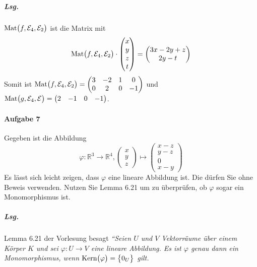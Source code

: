\documentclass{scrreprt}
\newcommand\Kern{\text{Kern}}
\newcommand\Mat{\text{Mat}}
\begin{document}
\begin{enumerate}[(a)]
  \subparagraph{Lsg.} $\Mat\qty\big(f, \mathcal{E}_4, \mathcal{E}_2)$ ist die
  Matrix mit
  \[
    \Mat\qty\big(f, \mathcal{E}_4, \mathcal{E}_2) \cdot
    \begin{pmatrix} x \\ y \\ z \\ t \end{pmatrix} =
    \begin{pmatrix} 3x - 2y + z \\ 2y - t \end{pmatrix}
  \]
  Somit ist $\Mat\qty\big(f, \mathcal{E}_4, \mathcal{E}_2) =
  \begin{pmatrix}
    3 & -2 & 1 & 0 \\
    0 & 2 & 0 & -1
  \end{pmatrix}$
  und
  $\Mat\qty\big(g, \mathcal{E}_4, \mathcal{E}) =
  \begin{pmatrix}
    2 & -1 & 0 & -1
  \end{pmatrix}$.
\end{enumerate}

\paragraph{Aufgabe 7} Gegeben ist die Abbildung
\[
  \varphi \colon \mathbb{R}^3 \to \mathbb{R}^4,
  \begin{pmatrix} x \\ y \\ z \end{pmatrix} \mapsto
  \begin{pmatrix} x - z \\ y - z \\ 0 \\ x - y \end{pmatrix}
\]
Es lässt sich leicht zeigen, dass $\varphi$ eine lineare Abbildung ist.
Die dürfen Sie ohne Beweis verwenden.
Nutzen Sie Lemma 6.21 um zu überprüfen, ob $\varphi$ sogar ein Monomorphismus ist.

\subparagraph{Lsg.} Lemma 6.21 der Vorlesung besagt \emph{``Seien $U$ und $V$
  Vektorräume über einem Körper $K$ und sei $\varphi \colon U \to V$ eine lineare
  Abbildung.
  Es ist $\varphi$ genau dann ein Monomorphismus, wenn
  $\Kern\qty\big(\varphi) = \qty\big{0_U}$ gilt.}
\end{document}
